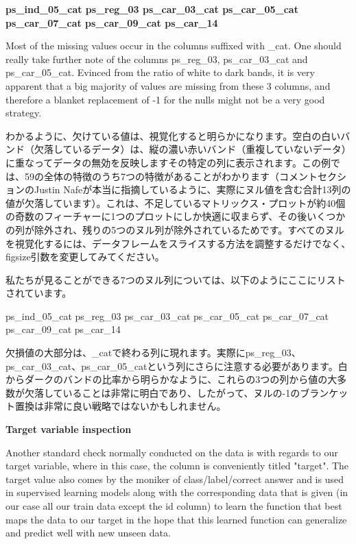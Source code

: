 \documentclass[11pt]{article}
\begin{document}
\textbf{ps\_ind\_05\_cat \textbar{} ps\_reg\_03 \textbar{}
ps\_car\_03\_cat \textbar{} ps\_car\_05\_cat \textbar{} ps\_car\_07\_cat
\textbar{} ps\_car\_09\_cat \textbar{} ps\_car\_14}

Most of the missing values occur in the columns suffixed with \_cat. One
should really take further note of the columns ps\_reg\_03,
ps\_car\_03\_cat and ps\_car\_05\_cat. Evinced from the ratio of white
to dark bands, it is very apparent that a big majority of values are
missing from these 3 columns, and therefore a blanket replacement of -1
for the nulls might not be a very good strategy.

    わかるように、欠けている値は、視覚化すると明らかになります。空白の白いバンド（欠落しているデータ）は、縦の濃い赤いバンド（重複していないデータ）に重なってデータの無効を反映しますその特定の列に表示されます。この例では、59の全体の特徴のうち7つの特徴があることがわかります（コメントセクションのJustin
Nafeが本当に指摘しているように、実際にヌル値を含む合計13列の値が欠落しています）。これは、不足しているマトリックス・プロットが約40個の奇数のフィーチャーに1つのプロットにしか快適に収まらず、その後いくつかの列が除外され、残りの5つのヌル列が除外されているためです。すべてのヌルを視覚化するには、データフレームをスライスする方法を調整するだけでなく、figsize引数を変更してみてください。

私たちが見ることができる7つのヌル列については、以下のようにここにリストされています。

ps\_ind\_05\_cat \textbar{} ps\_reg\_03 \textbar{} ps\_car\_03\_cat
\textbar{} ps\_car\_05\_cat \textbar{} ps\_car\_07\_cat \textbar{}
ps\_car\_09\_cat \textbar{} ps\_car\_14

欠損値の大部分は、\_catで終わる列に現れます。実際にps\_reg\_03、ps\_car\_03\_cat、ps\_car\_05\_catという列にさらに注意する必要があります。白からダークのバンドの比率から明らかなように、これらの3つの列から値の大多数が欠落していることは非常に明白であり、したがって、ヌルの-1のブランケット置換は非常に良い戦略ではないかもしれません。

    \textbf{Target variable inspection}

Another standard check normally conducted on the data is with regards to
our target variable, where in this case, the column is conveniently
titled "target". The target value also comes by the moniker of
class/label/correct answer and is used in supervised learning models
along with the corresponding data that is given (in our case all our
train data except the id column) to learn the function that best maps
the data to our target in the hope that this learned function can
generalize and predict well with new unseen data.
\end{document}
